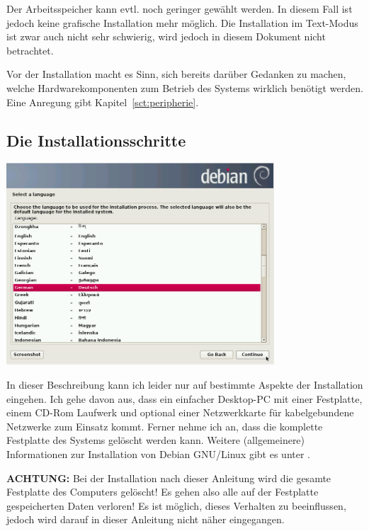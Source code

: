 \documentclass[a4paper,12pt,twoside]{article}
\begin{document}
Der Arbeitsspeicher kann evtl. noch geringer gewählt werden. In diesem
Fall ist jedoch keine grafische Installation mehr möglich. Die
Installation im Text-Modus ist zwar auch nicht sehr schwierig, wird
jedoch in diesem Dokument nicht betrachtet.

Vor der Installation macht es Sinn, sich bereits darüber Gedanken zu
machen, welche Hardwarekomponenten zum Betrieb des Systems wirklich
benötigt werden. Eine Anregung gibt Kapitel~\ref{sct:peripherie}.


\subsection{Die Installationsschritte}
\label{sct:inst_schritte}

\begin{minipage}{\linewidth}
    \centering
    \includegraphics[width=10cm]{efaLivede-img/efaLivede-img4.png}
    \label{fig:inst_sprache}
\end{minipage}

\bigskip
In dieser Beschreibung kann ich leider nur auf bestimmte Aspekte der
Installation eingehen. Ich gehe davon aus, dass ein einfacher
Desktop-PC mit einer Festplatte, einem CD-Rom Laufwerk und optional
einer Netzwerkkarte für kabelgebundene Netzwerke zum Einsatz kommt.
Ferner nehme ich an, dass die komplette Festplatte des Systems gelöscht
werden kann. Weitere (allgemeinere) Informationen zur Installation von
Debian GNU/Linux gibt es unter \cite{DEB2}.

\textbf{ACHTUNG:} Bei der Installation nach dieser Anleitung wird die gesamte
Festplatte des Computers gelöscht! Es gehen also alle auf der
Festplatte gespeicherten Daten verloren! Es ist möglich, dieses
Verhalten zu beeinflussen, jedoch wird darauf in dieser Anleitung nicht
näher eingegangen.
\end{document}

